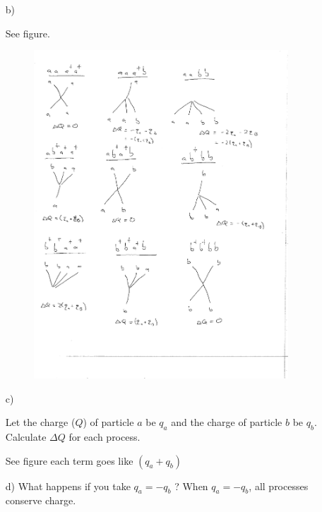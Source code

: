 {\begin{itemize}
\item[b)] {
See figure.

\begin{figure}[h!]
\centering
\includegraphics[width=0.9\textwidth]{./AntiParticlesSolutionb.pdf}
\end{figure}

}
\item[c)] {Let the charge ($Q$) of particle $a$ be $q_a$ and the charge of particle $b$ be $q_b$.  Calculate $\Delta Q$ for each process.

See figure each term goes like $(q_a+q_b)$ 
 }
\item[d)] {What happens if you take $q_a = -q_b$ ?
When $q_a = -q_b$, all processes conserve charge.
}
\end{itemize}





}


